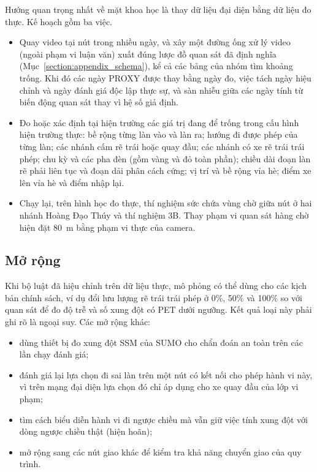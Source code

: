 \documentclass[../DoAn.tex]{subfiles}
\begin{document}
Hướng quan trọng nhất về mặt khoa học là thay dữ liệu đại diện bằng dữ liệu đo thực. Kế hoạch gồm ba việc.
\begin{itemize}
    \item Quay video tại nút trong nhiều ngày, và xây một đường ống xử lý video (ngoài phạm vi luận văn) xuất đúng lược đồ quan sát đã định nghĩa (Mục~\ref{section:appendix_schema}), kể cả các bảng của nhóm tìm khoảng trống. Khi đó các ngày PROXY được thay bằng ngày đo, việc tách ngày hiệu chỉnh và ngày đánh giá độc lập thực sự, và sàn nhiễu giữa các ngày tính từ biến động quan sát thay vì hệ số giả định.
    \item Đo hoặc xác định tại hiện trường các giá trị đang để trống trong cấu hình hiện trường thực: bề rộng từng làn vào và làn ra; hướng đi được phép của từng làn; các nhánh cấm rẽ trái hoặc quay đầu; các nhánh có xe rẽ trái trái phép; chu kỳ và các pha đèn (gồm vàng và đỏ toàn phần); chiều dài đoạn làn rẽ phải liên tục và đoạn dải phân cách cứng; vị trí và bề rộng vỉa hè; điểm xe lên vỉa hè và điểm nhập lại.
    \item Chạy lại, trên hình học đo thực, thí nghiệm sức chứa vùng chờ giữa nút ở hai nhánh Hoàng Đạo Thúy và thí nghiệm 3B. Thay phạm vi quan sát hàng chờ hiện đặt 80~m bằng phạm vi thực của camera.
\end{itemize}

\subsection{Mở rộng}

Khi bộ luật đã hiệu chỉnh trên dữ liệu thực, mô phỏng có thể dùng cho các kịch bản chính sách, ví dụ đổi lưu lượng rẽ trái trái phép ở 0\%, 50\% và 100\% so với quan sát để đo độ trễ và số xung đột có PET dưới ngưỡng. Kết quả loại này phải ghi rõ là ngoại suy. Các mở rộng khác:
\begin{itemize}
    \item dùng thiết bị đo xung đột SSM của SUMO cho chẩn đoán an toàn trên các lần chạy đánh giá;
    \item đánh giá lại lựa chọn đi sai làn trên một nút có kết nối cho phép hành vi này, vì trên mạng đại diện lựa chọn đó chỉ áp dụng cho xe quay đầu của lớp vi phạm;
    \item tìm cách biểu diễn hành vi đi ngược chiều mà vẫn giữ việc tính xung đột với dòng ngược chiều thật (hiện hoãn);
    \item mở rộng sang các nút giao khác để kiểm tra khả năng chuyển giao của quy trình.
\end{itemize}
\end{document}

